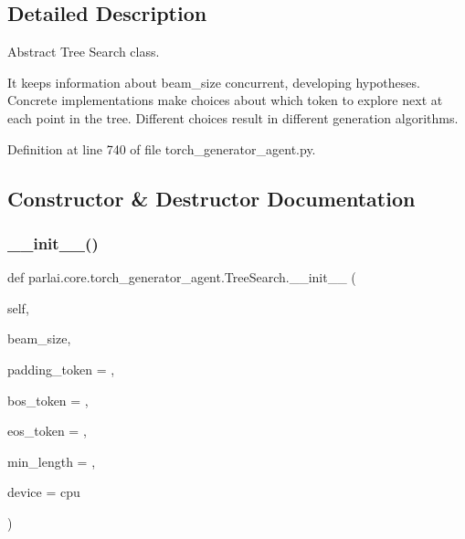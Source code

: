 \subsection{Detailed Description}
\begin{DoxyVerb}Abstract Tree Search class.

It keeps information about beam_size concurrent, developing hypotheses.
Concrete implementations make choices about which token to explore next at
each point in the tree. Different choices result in different generation
algorithms.
\end{DoxyVerb}
 

Definition at line 740 of file torch\+\_\+generator\+\_\+agent.\+py.



\subsection{Constructor \& Destructor Documentation}
\mbox{\label{classparlai_1_1core_1_1torch__generator__agent_1_1TreeSearch_aeb69e8fa4faed027eaacd69bc3148dce}} 
\subsubsection{\texorpdfstring{\+\_\+\+\_\+init\+\_\+\+\_\+()}{\_\_init\_\_()}}
{\footnotesize\ttfamily def parlai.\+core.\+torch\+\_\+generator\+\_\+agent.\+Tree\+Search.\+\_\+\+\_\+init\+\_\+\+\_\+ (\begin{DoxyParamCaption}\item[{}]{self,  }\item[{}]{beam\+\_\+size,  }\item[{}]{padding\+\_\+token = {},  }\item[{}]{bos\+\_\+token = {},  }\item[{}]{eos\+\_\+token = {},  }\item[{}]{min\+\_\+length = {},  }\item[{}]{device = {\ttfamily \textquotesingle{}cpu\textquotesingle{}} }\end{DoxyParamCaption})}

